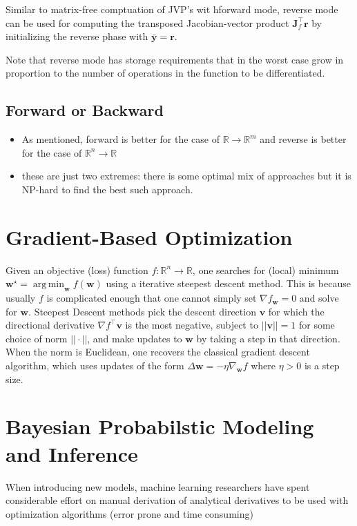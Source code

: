 \documentclass[11pt]{article}
\theoremstyle{definition}
\theoremstyle{plain}
\DeclareMathOperator*{\argmin}{arg\,min}
\renewcommand{\v}[1]{\mathbf{#1}}
\renewcommand{\b}[1]{\mathbb{#1}}
\begin{document}
\noindent Similar to matrix-free comptuation of JVP's wit hforward mode, reverse
mode can be used for computing the transposed Jacobian-vector product
$\v{J}_f^\top \v{r}$ by initializing the reverse phase with $\bar{\v{y}}=\v{r}$.

\noindent Note that reverse mode has storage requirements that in the worst case
grow in proportion to the number of operations in the function to be differentiated.

\subsection{Forward or Backward}

\begin{itemize}
    \item As mentioned, forward is better for the case of $\b{R} \rightarrow \b{R}^m$
    and reverse is better for the case of $\b{R}^n \rightarrow \b{R}$
    \item these are just two extremes: there is some optimal mix of approaches
          but it is NP-hard to find the best such approach.
\end{itemize}

\section{Gradient-Based Optimization}

\noindent Given an objective (loss) function $f: \b{R}^n \rightarrow \b{R}$,
one searches for (local) minimum $\v{w}^\star = \argmin_{\v{w}} f(\v{w})$ 
using a iterative steepest descent method. This is because usually
$f$ is complicated enough that one cannot simply set $\nabla f_{\v{w}} = 0$ and solve
for $\v{w}$. Steepest Descent methods pick the descent direction $\v{v}$ for which
the directional derivative $\nabla f^\top \v{v}$ is the most negative, subject
to $||\v{v}|| = 1$ for some choice of norm $||\cdot||$, and make updates to
$\v{w}$ by taking a step in that direction. When the norm is Euclidean, one
recovers the classical gradient descent algorithm, which uses
updates of the form $\Delta \v{w} = - \eta \nabla_{\v{w}} f$
where $\eta > 0$ is a step size. 

\section{Bayesian Probabilstic Modeling and Inference}

When introducing new models, machine learning researchers have spent considerable
effort on manual derivation of analytical derivatives to be used with
optimization algorithms (error prone and time consuming)
\end{document}
